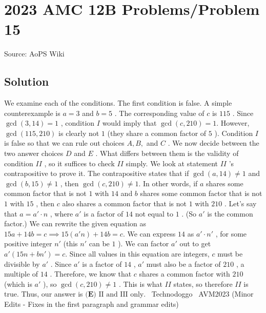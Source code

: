 \documentclass[12pt]{article}
\begin{document}
\section*{{2023 AMC 12B Problems/Problem 15}}
Source: AoPS Wiki

\subsection*{Solution}
We examine each of the conditions. The first condition is false. A simple counterexample is $a=3$ and $b=5$ . The corresponding value of $c$ is $115$ . Since $\gcd(3,14)=1$ , condition $I$ would imply that $\gcd(c,210)=1.$ However, $\gcd(115,210)$ is clearly not $1$ (they share a common factor of $5$ ). Condition $I$ is false so that we can rule out choices $A,B,$ and $C$ . We now decide between the two answer choices $D$ and $E$ . What differs between them is the validity of condition $II$ , so it suffices to check $II$ simply. We look at statement $II$ 's contrapositive to prove it. The contrapositive states that if $\gcd(a,14)\neq1$ and $\gcd(b,15)\neq1$ , then $\gcd(c,210)\neq1.$ In other words, if $a$ shares some common factor that is not $1$ with $14$ and $b$ shares some common factor that is not $1$ with $15$ , then $c$ also shares a common factor that is not $1$ with $210$ . Let's say that $a=a'\cdot n$ , where $a'$ is a factor of $14$ not equal to $1$ . (So $a'$ is the common factor.) We can rewrite the given equation as $15a+14b=c\implies15(a'n)+14b=c.$ We can express $14$ as $a'\cdot n'$ , for some positive integer $n'$ (this $n'$ can be $1$ ). We can factor $a'$ out to get $a'(15n+bn')=c.$ Since all values in this equation are integers, $c$ must be divisible by $a'$ . Since $a'$ is a factor of $14$ , $a'$ must also be a factor of $210$ , a multiple of $14$ . Therefore, we know that $c$ shares a common factor with $210$ (which is $a'$ ), so $\gcd(c,210)\neq1$ . This is what $II$ states, so therefore $II$ is true. Thus, our answer is $\boxed{\textbf{(E) }\text{II and III only}}.$ ~Technodoggo
~AVM2023 (Minor Edits - Fixes in the first paragraph and grammar edits)
\end{document}
